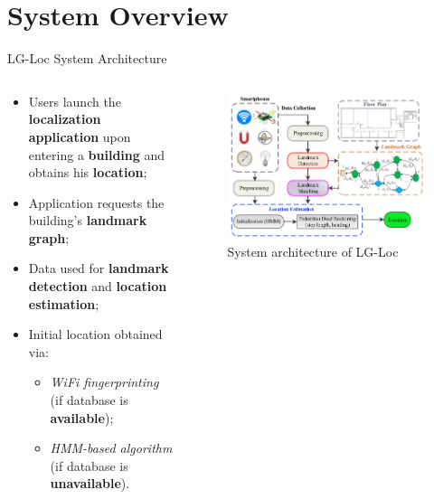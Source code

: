 \section[System]{System Overview}

\begin{frame}{LG-Loc System Architecture}
    \begin{columns}
        \begin{column}{.6\textwidth}
            \begin{itemize}
                \item Users launch the \textbf{localization application} upon entering a \textbf{building} and obtains his \textbf{location};
                \item Application requests the building's \textbf{landmark graph};
                \item Data used for \textbf{landmark detection} and \textbf{location estimation};
                \item Initial location obtained via:
                    \begin{itemize}
                        \item \textit{WiFi fingerprinting} (if database is \textbf{available});
                        \item \textit{HMM-based algorithm} (if database is \textbf{unavailable}).
                    \end{itemize}
            \end{itemize}
        \end{column}
        \begin{column}{.4\textwidth}
            \begin{figure}[t]
                \centering
                \includegraphics[width=\linewidth]{images/sys.jpg}
                \caption{System architecture of LG-Loc}
                \label{fig:sys}
            \end{figure}
        \end{column}
    \end{columns}
\end{frame}